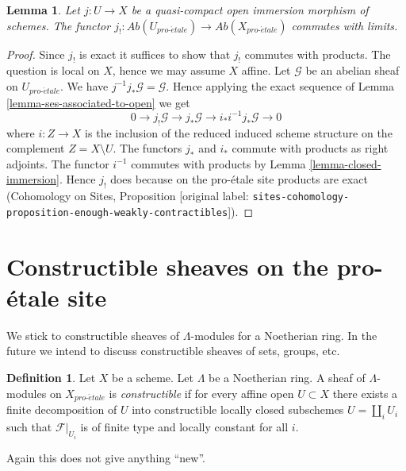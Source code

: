 \documentclass[10pt,a4paper]{article}
\theoremstyle{plain}
\newtheorem{lemma}[subsection]{Lemma}
\theoremstyle{definition}
\newtheorem{definition}[subsection]{Definition}
\theoremstyle{remark}
\numberwithin{equation}{subsection}
\def\proetale{{pro\text{-}\acute{e}tale}}
\begin{document}
\begin{lemma}
\label{lemma-j-shriek-limits}
Let $j : U \to X$ be a quasi-compact open immersion
morphism of schemes. The functor
$j_! : \textit{Ab}(U_\proetale) \to \textit{Ab}(X_\proetale)$
commutes with limits.
\end{lemma}

\begin{proof}
Since $j_!$ is exact it suffices to show that $j_!$ commutes with products.
The question is local on $X$, hence we may assume $X$ affine.
Let $\mathcal{G}$ be an abelian sheaf on $U_\proetale$.
We have $j^{-1}j_*\mathcal{G} = \mathcal{G}$. Hence applying
the exact sequence of Lemma \ref{lemma-ses-associated-to-open}
we get
$$
0 \to j_!\mathcal{G} \to j_*\mathcal{G} \to i_*i^{-1}j_*\mathcal{G} \to 0
$$
where $i : Z \to X$ is the inclusion of the reduced induced scheme
structure on the complement $Z = X \setminus U$.
The functors $j_*$ and $i_*$ commute with products as right adjoints.
The functor $i^{-1}$ commutes with products by
Lemma \ref{lemma-closed-immersion}.
Hence $j_!$ does because on the pro-\'etale site products
are exact
(Cohomology on Sites, Proposition
[original label: \nolinkurl{sites-cohomology-proposition-enough-weakly-contractibles}]).
\end{proof}




\section{Constructible sheaves on the pro-\'etale site}
\label{section-constructible}

\noindent
We stick to constructible sheaves of $\Lambda$-modules for a
Noetherian ring. In the future we intend to discuss constructible
sheaves of sets, groups, etc.

\begin{definition}
\label{definition-constructible}
Let $X$ be a scheme.
Let $\Lambda$ be a Noetherian ring. A sheaf of $\Lambda$-modules
on $X_\proetale$ is {\it constructible} if for every affine open
$U \subset X$ there exists a finite decomposition
of $U$ into constructible locally closed subschemes
$U = \coprod_i U_i$ such that
$\mathcal{F}|_{U_i}$ is of finite type and locally constant for all $i$.
\end{definition}

\noindent
Again this does not give anything ``new''.
\end{document}
